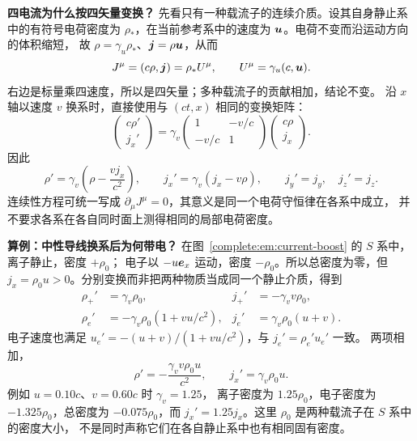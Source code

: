 \noindent\textbf{四电流为什么按四矢量变换？}
先看只有一种载流子的连续介质。设其自身静止系中的有符号电荷密度为
$\rho_*$，在当前参考系中的速度为 $\bm{u}$。电荷不变而沿运动方向的体积缩短，
故 $\rho=\gamma_u\rho_*$、$\bm{j}=\rho\bm{u}$，从而
\[
 J^\mu=(c\rho,\bm{j})=\rho_*U^\mu,
 \qquad U^\mu=\gamma_u(c,\bm{u}).
\]
右边是标量乘四速度，所以是四矢量；多种载流子的贡献相加，结论不变。
沿 $x$ 轴以速度 $v$ 换系时，直接使用与 $(ct,x)$ 相同的变换矩阵：
\[
 \begin{pmatrix}c\rho'\\j_x'\end{pmatrix}
 =\gamma_v\begin{pmatrix}1&-v/c\\-v/c&1\end{pmatrix}
 \begin{pmatrix}c\rho\\j_x\end{pmatrix}.
\]
因此
\[
 \boxed{\rho'=\gamma_v\left(\rho-\frac{vj_x}{c^2}\right),\qquad
 j_x'=\gamma_v(j_x-v\rho)},\qquad j_y'=j_y,\quad j_z'=j_z.
\]
连续性方程可统一写成 $\partial_\mu J^\mu=0$，其意义是同一个电荷守恒律在各系中成立，
并不要求各系在各自同时面上测得相同的局部电荷密度。

\begin{qualityfigure}
\end{qualityfigure}

\noindent\textbf{算例：中性导线换系后为何带电？}
在图~\ref{complete:em:current-boost} 的 $S$ 系中，离子静止，密度 $+\rho_0$；
电子以 $-u\bm{e}_x$ 运动，密度 $-\rho_0$。所以总密度为零，但
$j_x=\rho_0u>0$。分别变换而非把两种物质当成同一个静止介质，得到
\[
 \begin{aligned}
 \rho_+'&=\gamma_v\rho_0,&j_+'&=-\gamma_vv\rho_0,\\
 \rho_e'&=-\gamma_v\rho_0(1+vu/c^2),&
 j_e'&=\gamma_v\rho_0(u+v).
 \end{aligned}
\]
电子速度也满足 $u_e'=-(u+v)/(1+vu/c^2)$，与 $j_e'=\rho_e'u_e'$ 一致。
两项相加，
\[
 \rho'=-\frac{\gamma_vv\rho_0u}{c^2},\qquad
 j_x'=\gamma_v\rho_0u.
\]
例如 $u=0.10c$、$v=0.60c$ 时 $\gamma_v=1.25$，
离子密度为 $1.25\rho_0$，电子密度为 $-1.325\rho_0$，总密度为
$-0.075\rho_0$，而 $j_x'=1.25j_x$。这里 $\rho_0$ 是两种载流子在 $S$ 系中的密度大小，
不是同时声称它们在各自静止系中也有相同固有密度。

